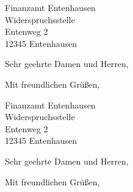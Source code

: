 \documentclass[12pt,ngerman,parskip=half]{scrlttr2}
\begin{document}
\begin{letter}{Finanzamt Entenhausen \\ Widerspruchsstelle \\ Entenweg 2 \\ 12345 Entenhausen}

\opening{Sehr geehrte Damen und Herren,}

\blindtext

\blindtext

\blindtext

\closing{Mit freundlichen Grüßen,}
\end{letter}
\begin{letter}{Finanzamt Entenhausen \\ Widerspruchsstelle \\ Entenweg 2 \\ 12345 Entenhausen}

\opening{Sehr geehrte Damen und Herren,}

\blindtext

\blindtext

\blindtext

\closing{Mit freundlichen Grüßen,}
\end{letter}
\end{document}
